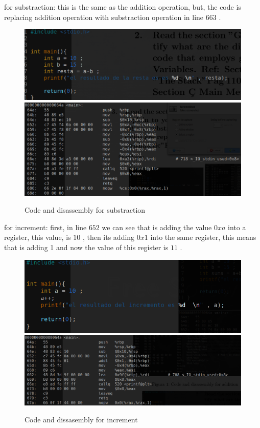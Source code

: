 \documentclass[10pt,a4paper]{article} %
\begin{document}
        \newpage
        for substraction:
        this is the same as the addition operation, but, the code is replacing
        addition operation with substraction operation in line $ 663  $ .
        \begin{figure}[h!]
            \centering
            \includegraphics[width=1.0\linewidth]{codeforres.png}
            \includegraphics[width=1.0\linewidth]{resdis.png}
            \caption{Code and disassembly for substraction}
            \label{subfig}
        \end{figure}


        \newpage
        for increment:
        first, in line $ 652  $ we can see that is adding the value $ 0xa  $
        into a register, this value, is $ 10  $  , then its adding $ 0x1  $
        into the same register, this means that is adding 1 and now the value
        of this register is $ 11  $ .
        \begin{figure}[h!]
            \centering
            \includegraphics[width=1.0\linewidth]{codeinc.png}
            \includegraphics[width=1.0\linewidth]{incdis.png}
            \caption{Code and dissasembly for increment}
            \label{incfig}
        \end{figure}
\end{document}

